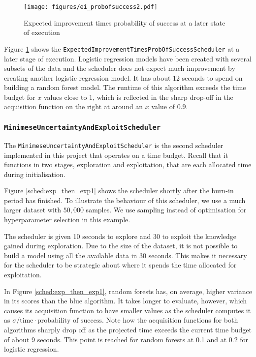 \documentclass[a4paper,12pt,twoside,openright]{report}
\begin{document}
\begin{figure}
\centering
  \texttt{[image: figures/ei\_probofsuccess2.pdf]}
  \caption{Expected improvement times probability of success at a later state of execution}
  \label{sched:expimprpertime02}
\end{figure}

Figure \ref{sched:expimprpertime02} shows the \texttt{ExpectedImprovementTimesProbOfSuccessScheduler} at a later stage of execution. Logistic regression models have been created with several subsets of the data and the scheduler does not expect much improvement by creating another logistic regression model. It has about 12 seconds to spend on building a random forest model. The runtime of this algorithm exceeds the time budget for $x$ values close to 1, which is reflected in the sharp drop-off in the acquisition function on the right at around an $x$ value of $0.9$.

\subsubsection{\texttt{MinimeseUncertaintyAndExploitScheduler}}

The \texttt{MinimeseUncertaintyAndExploitScheduler} is the second scheduler implemented in this project that operates on a time budget. Recall that it functions in two stages, exploration and exploitation, that are each allocated time during initialisation.

Figure \ref{sched:exp_then_exp1} shows the scheduler shortly after the burn-in period has finished. To illustrate the behaviour of this scheduler, we use a much larger dataset with $50,000$ samples. We use sampling instead of optimisation for hyperparameter selection in this example.

The scheduler is given 10 seconds to explore and 30 to exploit the knowledge gained during exploration. Due to the size of the dataset, it is not possible to build a model using all the available data in 30 seconds. This makes it necessary for the scheduler to be strategic about where it spends the time allocated for exploitation.

In Figure \ref{sched:exp_then_exp1}, random forests has, on average, higher variance in its scores than the blue algorithm. It takes longer to evaluate, however, which causes its acquisition function to have smaller values as the scheduler computes it as $\sigma/\text{time} \cdot \text{probability of success}$. Note how the acquisition functions for both algorithms sharply drop off as the projected time exceeds the current time budget of about 9 seconds. This point is reached for random forests at 0.1 and at 0.2 for logistic regression.
\end{document}
